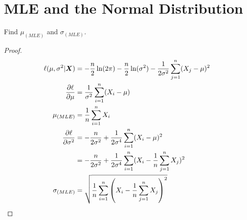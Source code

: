 \documentclass{article}
\begin{document}
\maketitle 
\setlength{\parindent}{0pt}

\section{MLE and the Normal Distribution}
    
    Find $\mu_{(MLE)}$ and $\sigma_{(MLE)}$. 
    \begin{proof}
    \begin{align*}
        \ell(\mu, \sigma^2 | \boldsymbol{X}) &= -\frac{n}{2}\ln(2\pi) -
        \frac{n}{2}\ln(\sigma^2) - \frac{1}{2\sigma^2}\sum_{j=1}^n (X_j - \mu)^2
        \\
        \frac{\partial \ell}{\partial \mu} &= \frac{1}{\sigma^2}\sum_{i=1}^n (X_i-\mu)
        \\
        \mu_{(MLE)} &= \frac{1}{n}\sum_{i=1}^n X_i
        \\
        \frac{\partial \ell}{\partial \sigma^2} &= -\frac{n}{2\sigma^2} +
        \frac{1}{2\sigma^4}\sum_{i=1}^n (X_i - \mu)^2
        \\
        &= -\frac{n}{2\sigma^2} +
        \frac{1}{2\sigma^4}\sum_{i=1}^n (X_i - \frac{1}{n}\sum_{j=1}^n X_j)^2
        \\
        \sigma_{(MLE)} &= \sqrt{\frac{1}{n}\sum_{i=1}^n\left(X_i -
        \frac{1}{n}\sum_{j=1}^n X_j\right)^2}
    \end{align*}
    \end{proof}
\end{document}
